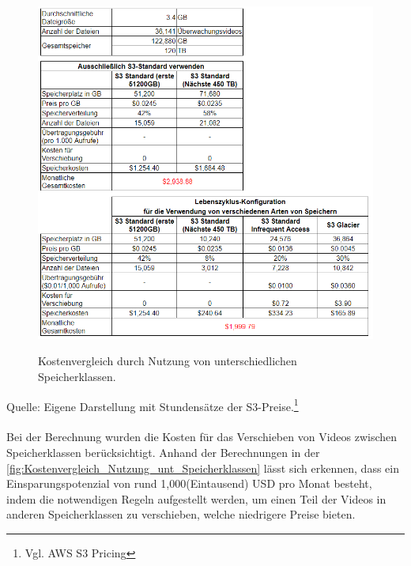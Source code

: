 \begin{figure}[h!]
  \centering
  \includegraphics[scale=0.75]{sources/Kostenvergleich_Nutzung_unt_Speicherklassen}
  \caption[Kostenvergleich durch Nutzung von unterschiedlichen Speicherklassen]{}\label{fig:Kostenvergleich_Nutzung_unt_Speicherklassen} 
  Kostenvergleich durch Nutzung von unterschiedlichen Speicherklassen.  
\end{figure}
Quelle: Eigene Darstellung mit Stundensätze der S3-Preise.\footnote{Vgl. AWS S3 Pricing\cite{AMZ09}}
\\\\
Bei der Berechnung wurden die Kosten für das Verschieben von Videos zwischen Speicherklassen berücksichtigt. Anhand der Berechnungen in der \autoref{fig:Kostenvergleich_Nutzung_unt_Speicherklassen} lässt sich erkennen, dass ein Einsparungspotenzial von rund 1,000(Eintausend) USD pro Monat besteht, indem die notwendigen Regeln aufgestellt werden, um einen Teil der Videos in anderen Speicherklassen zu verschieben, welche niedrigere Preise bieten.
\newpage
